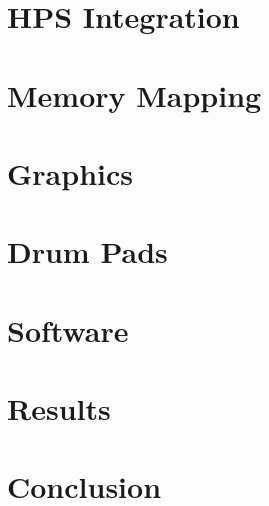 \documentclass[10pt, letterpaper]{IEEEtran}
\begin{document}
  \section{HPS Integration}
  

  \section{Memory Mapping}
  

  \section{Graphics}
   

  \section{Drum Pads}
  

  \section{Software}
  

  \section{Results}
  

  \section{Conclusion}
  

  \nocite{*}
  \printbibliography
  
  
\end{document}
